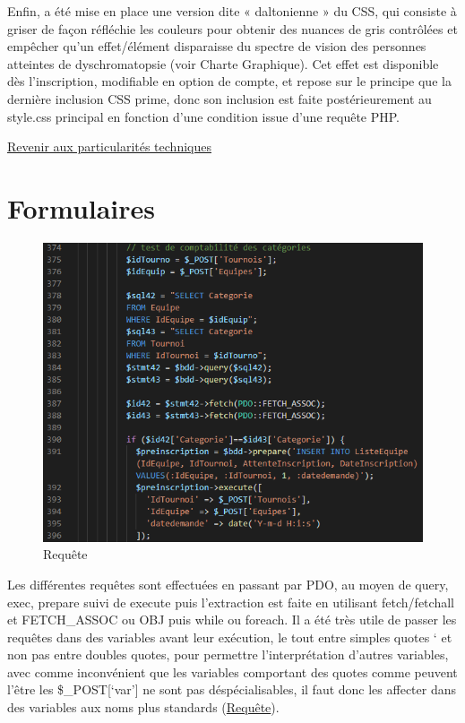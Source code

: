 \documentclass[12pt]{report}
\begin{document}
\bigskip
\par
Enfin, a été mise en place une version dite « daltonienne » du CSS, qui consiste à griser de façon réfléchie les couleurs pour obtenir des nuances de gris contrôlées et empêcher qu’un effet/élément disparaisse du spectre de vision des personnes atteintes de dyschromatopsie (voir Charte Graphique). Cet effet est disponible dès l’inscription, modifiable en option de compte, et repose sur le principe que la dernière inclusion CSS prime, donc son inclusion est faite postérieurement au style.css principal en fonction d’une condition issue d’une requête PHP.
\bigskip
\par
\hyperlink{retour-rendu-visuel}{Revenir aux particularités techniques}
\newpage
	    \section {Formulaires}
	    \hypertarget{annexe-formulaires}{}
\begin{figure}
\hypertarget{fig-requete}{}
\includegraphics[width=0.9\linewidth]{figures/pt-requete.png}
\caption{Requête}
\end{figure}
\par
Les différentes requêtes sont effectuées en passant par PDO, au moyen de query, exec, prepare suivi de execute puis l’extraction est faite en utilisant fetch/fetchall et FETCH\_ASSOC ou OBJ puis while ou foreach. Il a été très utile de passer les requêtes dans des variables avant leur exécution, le tout entre simples quotes ‘ et non pas entre doubles quotes, pour permettre l’interprétation d’autres variables, avec comme inconvénient que les variables comportant des quotes comme peuvent l’être les \$\_POST[‘var’] ne sont pas déspécialisables, il faut donc les affecter dans des variables aux noms plus standards (\hyperlink{fig-requete}{Requête}).
\end{document}
